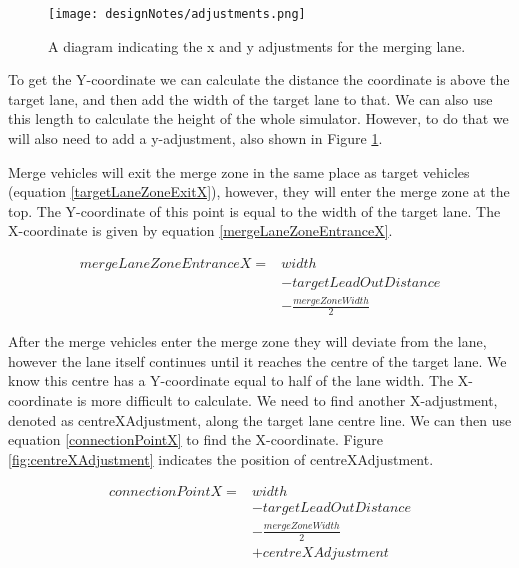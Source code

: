 \begin{figure}[htb]
\centering
\texttt{[image: designNotes/adjustments.png]}
\caption{A diagram indicating the x and y adjustments for the merging lane.}
\label{fig:adjustments}
\end{figure}

To get the Y-coordinate we can calculate the distance the coordinate is above the target lane, and then add the width of the target lane to that. We can also use this length to calculate the height of the whole simulator. However, to do that we will also need to add a y-adjustment, also shown in Figure \ref{fig:adjustments}.

Merge vehicles will exit the merge zone in the same place as target vehicles (equation \ref{targetLaneZoneExitX}), however, they will enter the merge zone at the top. The Y-coordinate of this point is equal to the width of the target lane. The X-coordinate is given by equation \ref{mergeLaneZoneEntranceX}.

\begin{equation}\label{mergeLaneZoneEntranceX}
	\begin{split}
mergeLaneZoneEntranceX = & width \\
						 & - targetLeadOutDistance \\
						 & - \frac{mergeZoneWidth}{2}
	\end{split}
\end{equation}

After the merge vehicles enter the merge zone they will deviate from the lane, however the lane itself continues until it reaches the centre of the target lane. We know this centre has a Y-coordinate equal to half of the lane width. The X-coordinate is more difficult to calculate. We need to find another X-adjustment, denoted as centreXAdjustment, along the target lane centre line. We can then use equation \ref{connectionPointX} to find the X-coordinate. Figure \ref{fig:centreXAdjustment} indicates the position of centreXAdjustment.

\begin{equation}\label{connectionPointX}
	\begin{split}
connectionPointX = & width \\
				   & - targetLeadOutDistance \\
				   & - \frac{mergeZoneWidth}{2} \\
				   & + centreXAdjustment \\
	\end{split}
\end{equation}

